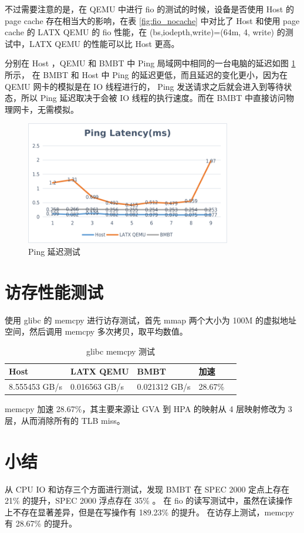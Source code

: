 不过需要注意的是，在 QEMU 中进行 fio 的测试的时候，设备是否使用 Host 的 page cache 存在相当大的影响，在表 \ref{fig:fio_nocache} 中对比了
Host 和使用 page cache 的 LATX QEMU 的 fio 性能，在 (bs,iodepth,write)=(64m, 4, write) 的测试中，LATX QEMU 的性能可以比 Host 更高。

分别在 Host ，QEMU 和 BMBT 中 Ping 局域网中相同的一台电脑的延迟如图 \ref{fig:Ping} 所示，
在 BMBT 和 Host 中 Ping 的延迟更低，而且延迟的变化更小，因为在 QEMU 网卡的模拟是在 IO 线程进行的，
Ping 发送请求之后就会进入到等待状态，所以 Ping 延迟取决于会被 IO 线程的执行速度。而在 BMBT 中直接访问物理网卡，无需模拟。

\begin{figure}[!htbp]
	\centering
	\includegraphics[width=0.8\textwidth]{./images/Ping.png}
	\caption{Ping 延迟测试}
	\label{fig:Ping}
\end{figure}

\section{访存性能测试}
使用 glibc 的 memcpy 进行访存测试，首先 mmap 两个大小为 100M 的虚拟地址空间，然后调用 memcpy 多次拷贝，取平均数值。

\begin{table}[!ht]
	\centering
	\caption{glibc memcpy 测试}
	\begin{tabular}{|l|l|l|l|l|}
		\hline
		Host          & LATX QEMU     & BMBT          & 加速    \\ \hline
		8.555453 GB/s & 0.016563 GB/s & 0.021312 GB/s & 28.67\% \\ \hline
	\end{tabular}
	\label{fig:glibc_memcpy}
\end{table}
memcpy 加速 28.67\%，其主要来源让 GVA 到 HPA 的映射从 4 层映射修改为 3 层，从而消除所有的 TLB miss。

\section{小结}
从 CPU IO 和访存三个方面进行测试，发现 BMBT 在 SPEC 2000 定点上存在 21\% 的提升，SPEC 2000 浮点存在 35\% 。
在 fio 的读写测试中，虽然在读操作上不存在显著差异，但是在写操作有 189.23\% 的提升。
在访存上测试，memcpy 有 28.67\% 的提升。

